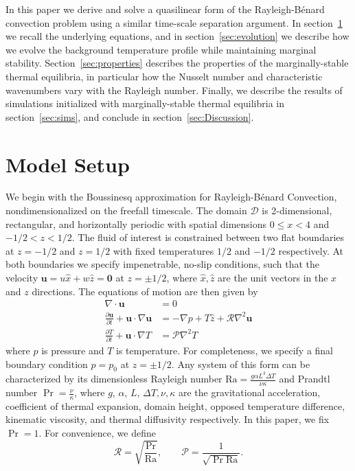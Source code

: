 \documentclass[reprint,amsmath,amssymb,aps]{revtex4-1}
\newcommand\Ra{\mathrm{Ra}}
\renewcommand{\vec}[1]{\boldsymbol{#1}}
\begin{document}
In this paper we derive and solve a quasilinear form of the Rayleigh-B\'{e}nard convection problem using a similar time-scale separation argument.
In section~\ref{sec:model} we recall the underlying equations, and in section~\ref{sec:evolution} we describe how we evolve the background temperature profile while maintaining marginal stability.
Section~\ref{sec:properties} describes the properties of the marginally-stable thermal equilibria, in particular how the Nusselt number and characteristic wavenumbers vary with the Rayleigh number.
Finally, we describe the results of simulations initialized with marginally-stable thermal equilibria in section~\ref{sec:sims}, and conclude in section~\ref{sec:Discussion}.
 
\section{Model Setup}\label{sec:model}
We begin with the Boussinesq approximation for Rayleigh-Bénard Convection, nondimensionalized on the freefall timescale. 
The domain $\mathcal{D}$ is 2-dimensional, rectangular, and horizontally periodic with spatial dimensions $0 \leq x < 4$ and $-1/2 < z < 1/2$. 
The fluid of interest is constrained between two flat boundaries at $z = -1/2$ and $z = 1/2$ with fixed temperatures $1/2$ and $-1/2$ respectively. 
At both boundaries we specify impenetrable, no-slip conditions, such that the velocity $\vec{u} = u \hat{x} + w \hat{z} = \vec{0}$ at $z = \pm 1/2$, where $\hat{x}, \hat{z}$ are the unit vectors in the $x$ and $z$ directions. 
The equations of motion are then given by
\begin{align}
    \nabla \cdot \vec{u} &= 0 \label{EQ:motion1}\\
    \frac{\partial \vec{u}}{\partial t} + \vec{u} \cdot \nabla \vec{u} &= - \nabla p + T \hat{z} + \mathcal{R} \nabla^2 \vec{u} \label{EQ:motion2}\\
    \frac{\partial T}{\partial t} + \vec{u} \cdot \nabla T &= \mathcal{P} \nabla^2 T \label{EQ:motion3}
\end{align}
where $p$ is pressure and $T$ is temperature. 
For completeness, we specify a final boundary condition $p = p_0$ at $z = \pm 1/2$. 
Any system of this form can be characterized by its dimensionless Rayleigh number $\Ra = \frac{g\alpha L^3 \Delta T}{\nu \kappa}$ and Prandtl number $\Pr = \frac{\nu}{\kappa}$, where $g, \, \alpha, \, L, \, \Delta T, \nu, \kappa$ are the gravitational acceleration, coefficient of thermal expansion, domain height, opposed temperature difference, kinematic viscosity, and thermal diffusivity respectively. 
In this paper, we fix $\Pr = 1$.
For convenience, we define
\begin{equation}
\mathcal{R} = \sqrt{\frac{\Pr}{\Ra}}, \qquad \mathcal{P} = \frac{1}{\sqrt{\Pr \Ra}}.
\end{equation}
\end{document}
